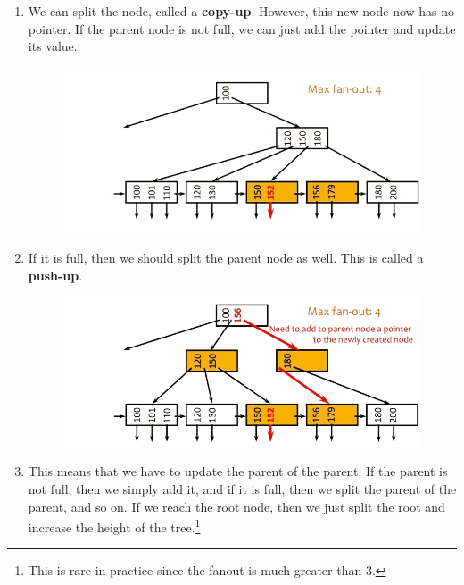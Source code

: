 \documentclass{article}
\begin{document}
\begin{algo}[Insertion]
\begin{enumerate}
          \item We can split the node, called a \textbf{copy-up}. However, this new node now has no pointer. If the parent node is not full, we can just add the pointer and update its value. 

          \begin{figure}[H]
            \centering 
            \includegraphics[scale=0.4]{img/insertion_2.png}
            \caption{} 
            \label{fig:insertion_2}
          \end{figure}

          \item If it is full, then we should split the parent node as well. This is called a \textbf{push-up}. 

          \begin{figure}[H]
            \centering 
            \includegraphics[scale=0.4]{img/insertion_3.png}
            \caption{} 
            \label{fig:insertion_3.png}
          \end{figure}

          \item This means that we have to update the parent of the parent. If the parent is not full, then we simply add it, and if it is full, then we split the parent of the parent, and so on. If we reach the root node, then we just split the root and increase the height of the tree.\footnote{This is rare in practice since the fanout is much greater than 3.}
        \end{enumerate}
      \end{algo}
\end{document}
